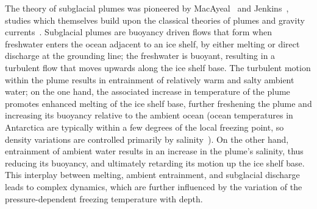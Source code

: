 \documentclass[openacc]{rsproca_new}%
\begin{document}
The theory of subglacial plumes was pioneered by MacAyeal~\cite{MacAyeal1985} and Jenkins~\cite{Jenkins1991JGeophysResOceans}, studies which themselves build upon the classical theories of plumes and gravity currents~\cite[e.g.][]{Ellison1959JFM, Morton1956PRSL}. Subglacial plumes are buoyancy driven flows that form when freshwater enters the ocean adjacent to an ice shelf, by either melting or direct discharge at the grounding line; the freshwater is buoyant, resulting in a turbulent flow that moves upwards along the ice shelf base. The turbulent motion within the plume results in entrainment of relatively warm and salty ambient water; on the one hand, the associated increase in temperature of the plume promotes enhanced melting of the ice shelf base, further freshening the plume and increasing its buoyancy relative to the ambient ocean (ocean temperatures in Antarctica are typically within a few degrees of the local freezing point, so density variations are controlled primarily by salinity~\cite{Hewitt2020AnnRevFlu}). On the other hand, entrainment of ambient water results in an increase in the plume's salinity, thus reducing its buoyancy, and ultimately retarding its motion up the ice shelf base. This interplay between melting, ambient entrainment, and subglacial discharge leads to complex dynamics, which are further influenced by the variation of the pressure-dependent freezing temperature with depth. 
\end{document}
